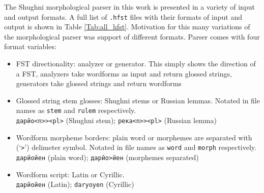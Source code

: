 The Shughni morphological parser in this work is presented in a variety of input and output formats. A full list of \texttt{.hfst} files with their formats of input and output is shown in Table \ref{Tab:all_hfst}. Motivation for this many variations of the morphological parser was support of different formats. Parser comes with four format variables:
\begin{itemize}
    \item FST directionality: analyzer or generator. This simply shows the direction of a FST, analyzers take wordforms as input and return glossed strings, generators take glossed strings and return wordforms
    \item Glossed string stem glosses: Shughni stems or Russian lemmas. Notated in file names as \texttt{stem} and \texttt{rulem} respectively.\\
    \texttt{дарйо<n>><pl>} (Shughni stem); \texttt{река<n>><pl>} (Russian lemma)
    \item Wordform morpheme borders: plain word or morphemes are separated with (`\texttt{>}') delimeter symbol. Notated in file names as \texttt{word} and \texttt{morph} respectively.\\
    \texttt{дарйойен} (plain word); \texttt{дарйо>йен} (morphemes separated)
    \item Wordform script: Latin or Cyrillic.\\
    \texttt{дарйойен} (Latin); \texttt{daryoyen} (Cyrillic)
\end{itemize}

